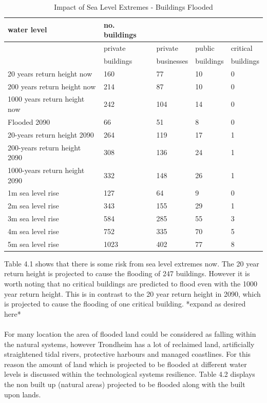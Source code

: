 \begin{table}[h]
    \centering
    \begin{tabular}{|l|l|l|l|l|}
    \hline
        water level & no. buildings  & ~ & ~ & ~ \\ \hline
        ~ & private & private & public  & critical  \\ \hline
        ~ & buildings & businesses & buildings & buildings \\ \hline        
        20 years return height now & 160 & 77 & 10 & 0 \\ \hline
        200 years return height now & 214 & 87 & 10 & 0 \\ \hline
        1000 years return height now & 242 & 104 & 14 & 0 \\ \hline
        Flooded 2090 & 66 & 51 & 8 & 0 \\ \hline
        20-years return height 2090 & 264 & 119 & 17 & 1 \\ \hline
        200-years return height  2090 & 308 & 136 & 24 & 1 \\ \hline
        1000-years return height  2090 & 332 & 148 & 26 & 1 \\ \hline
        1m sea level rise & 127 & 64 & 9 & 0 \\ \hline
        2m sea level rise & 343 & 155 & 29 & 1 \\ \hline
        3m sea level rise & 584 & 285 & 55 & 3 \\ \hline
        4m sea level rise & 752 & 335 & 70 & 5 \\ \hline
        5m sea level rise & 1023 & 402 & 77 & 8 \\ \hline
    \end{tabular}
    \caption{Impact of Sea Level Extremes - Buildings Flooded}
    \label{building-impact-sle}
\end{table}
Table 4.1 shows that there is some risk from sea level extremes now. The 20 year return height is projected to cause the flooding of 247 buildings. However it is worth noting that no critical buildings are predicted to flood even with the 1000 year return height. This is in contrast to the 20 year return height in 2090, which is projected to cause the flooding of one critical building.
*expand as desired here*



\paragraph{}
For many location the area of flooded land could be considered as falling within the natural systems, however Trondheim has a lot of reclaimed land, artificially straightened tidal rivers, protective harbours and managed coastlines. For this reason the amount of land which is projected to be flooded at different water levels is discussed within the technological systems resilience. Table 4.2 displays the non built up (natural areas) projected to be flooded along with the built upon lands.

